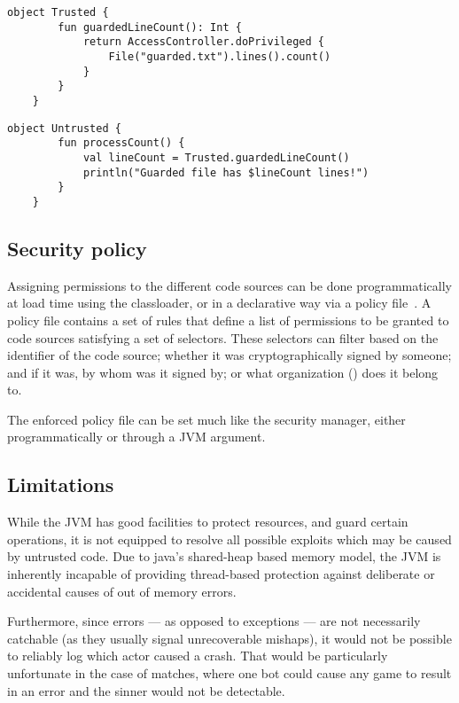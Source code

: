 	\begin{center}
		\begin{minipage}{12cm}
		\begin{lstlisting}[title={\code{Trusted.kt}}]
	object Trusted {
		fun guardedLineCount(): Int {
			return AccessController.doPrivileged {
				File("guarded.txt").lines().count()
			}
		}
	}
		\end{lstlisting}
	
		\begin{lstlisting}[title={\code{Untrusted.kt}}]
	object Untrusted {
		fun processCount() {
			val lineCount = Trusted.guardedLineCount()
			println("Guarded file has $lineCount lines!")
		}
	}
		\end{lstlisting}
		\end{minipage}
	\end{center}

	\subsection{Security policy}
	
	Assigning permissions to the different code sources can be done programmatically at load time using the classloader, or in a declarative way via a policy file~\cite{JavaPermissionsPolicy}. A policy file contains a set of rules that define a list of permissions to be granted to code sources satisfying a set of selectors. These selectors can filter based on the identifier of the code source; whether it was cryptographically signed by someone; and if it was, by whom was it signed by; or what organization () does it belong to.
	
	The enforced policy file can be set much like the security manager, either programmatically or through a JVM argument. 

	\subsection{Limitations}
	
	While the JVM has good facilities to protect resources, and guard certain operations, it is not equipped to resolve all possible exploits which may be caused by untrusted code. Due to java's shared-heap based memory model, the JVM is inherently incapable of providing thread-based protection against deliberate or accidental causes of out of memory errors.
	
	Furthermore, since errors --- as opposed to exceptions --- are not necessarily catchable (as they usually signal unrecoverable mishaps), it would not be possible to reliably log which actor caused a crash. That would be particularly unfortunate in the case of matches, where one bot could cause any game to result in an error and the sinner would not be detectable.

